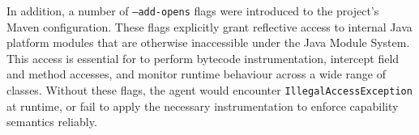 In addition, a number of \texttt{--add-opens} flags were introduced to the project's Maven configuration. These flags explicitly grant reflective access to internal Java platform modules that are otherwise inaccessible under the Java Module System. This access is essential for \jdala to perform bytecode instrumentation, intercept field and method accesses, and monitor runtime behaviour across a wide range of classes. Without these flags, the agent would encounter \texttt{IllegalAccessException} at runtime, or fail to apply the necessary instrumentation to enforce capability semantics reliably.

